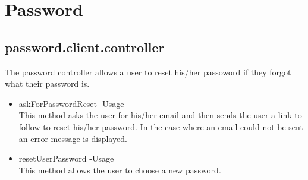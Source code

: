 \documentclass[a4paper,12pt]{article}
\begin{document}
 \section{Password}
 \subsection{password.client.controller}
 The password controller allows a user to reset his/her passoword if they forgot what their password is. 
 \begin{itemize}
 \item askForPasswordReset
 -Usage\\
 This method asks the user for his/her email and then sends the user a link to follow to reset his/her password. In the case where an email could not be sent an error message is displayed.
 \item resetUserPassword
 -Usage\\
 This method allows the user to choose a new password.
 \end{itemize}
 
\end{document}
